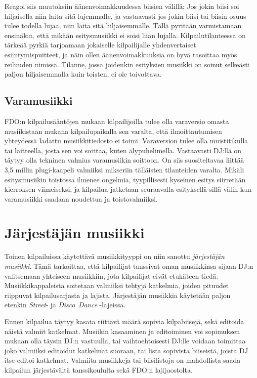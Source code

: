 \documentclass[12pt, a4paper, oneside]{article}
\begin{document}
Reagoi siis muutoksiin äänenvoimakkuudessa biisien välillä: Jos jokin biisi soi hiljaisella niin laita sitä lujemmalle,
ja vastaavasti jos jokin biisi tai biisin osuus tulee todella lujaa,
niin laita sitä hiljaisemmalle.
Tällä pyritään varmistamaan ensinäkin,
että mikään esitysmusiikki ei soisi liian lujalla.
Kilpailutilanteessa on tärkeää pyrkiä tarjoamaan jokaiselle kilpailijalle yhdenvertaiset esiintymispuitteet,
ja näin ollen äänenvoimakkuuksia on hyvä tasoittaa myös reiluuden nimissä.
Tilanne,
jossa joidenkin esityksien musiikki on soinut selkeästi paljon hiljaisemmalla kuin toisten,
ei ole toivottava.

\subsection{Varamusiikki}

FDO:n kilpailusääntöjen mukaan kilpailijoilla tulee olla varaversio omasta musiikistaan mukana kilpailupaikalla sen varalta,
että ilmoittautumisen yhteydessä ladattu musiikkitiedosto ei toimi.
Varaversion tulee olla muistitikulla tai laitteella,
josta sen voi soittaa,
kuten älypuhelimella.
Vastaavasti DJ:llä on täytyy olla tekninen valmius varamusiikin soittoon.
On siis suositeltavaa liittää 3,5 millin plugi-kaapeli valmiiksi mikseriin tälläisten tilanteiden varalta.
Mikäli esitysmusiikin toistossa ilmenee ongelmia,
tyypillisesti kyseinen esitys siirretään kierroksen viimeiseksi,
ja kilpailua jatketaan seuraavalla esityksellä sillä välin kun varamusiikki saadaan noudettua ja toistovalmiiksi.

\section{Järjestäjän musiikki} \label{dj_musa}

Toinen kilpailuissa käytettävä musiikkityyppi on niin sanottu \textit{järjestäjän musiikki}.
Tämä tarkoittaa,
että kilpailijat tanssivat oman musiikkinsa sijaan DJ:n valitsemaan yhteiseen musiikkiin,
jota kilpailijat eivät etukäteen tiedä.
Musiikkikappaleista soitetaan valmiiksi tehtyjä katkelmia,
joiden pituudet riippuvat kilpailusarjasta ja lajista.
Järjestäjän musiikkia käytetään paljon etenkin \textit{Street}- ja \textit{Disco~Dance} -lajeissa.

Ennen kilpailua täytyy kasata riittävä määrä sopivia kilpabiisejä,
sekä editoida näistä valmiit katkelmat.
Musiikin kasaaminen ja editoiminen voi sopimuksen mukaan olla täysin DJ:n vastuulla,
tai vaihtoehtoisesti DJ:lle voidaan toimittaa joko valmiiksi editoidut katkelmat suoraan,
tai lista sopivista biiseistä,
joista DJ itse editoi katkelmat.
Valmiita musiikkeja tai biisilistoja on mahdollista saada kilpailun järjestävältä tanssikoululta sekä FDO:n lajijaostolta.
\end{document}
